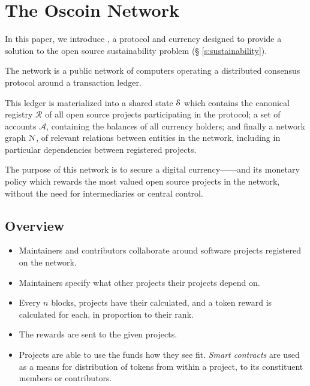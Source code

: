 \section{The Oscoin Network}
\label{s:oscoin}



\noindent In this paper, we introduce \oscoin{}, a protocol and currency
designed to provide a solution to the open source sustainability problem (\S
\ref{s:sustainability}).

The \oscoin{} network is a public network of computers operating a distributed
consensus protocol around a transaction ledger.

This ledger is materialized into a shared state $\mathcal{S}$ which
contains the canonical registry $\mathcal{R}$ of all open source
projects participating in the \oscoin{} protocol; a set of accounts
$\mathcal{A}$, containing the balances of all currency holders; and
finally a network graph $\mathcal{N}$, of relevant relations between
entities in the network, including in particular dependencies between
registered projects.

The purpose of this network is to secure a digital currency---\oscoin{}---and
its monetary policy which rewards the most valued open source projects in the
network, without the need for intermediaries or central control.

\subsection{Overview}

\begin{itemize}
    \item Maintainers and contributors collaborate around software projects
        registered on the network.
    \item Maintainers specify what other projects their projects depend on.
    \item Every $n$ blocks, projects have their \osrank{} calculated, and a
        token reward is calculated for each, in proportion to their rank.
    \item The rewards are sent to the given projects.
    \item Projects are able to use the funds how they see fit. \emph{Smart
        contracts} are used as a means for distribution of tokens from within a
        project, to its constituent members or contributors.
\end{itemize}

